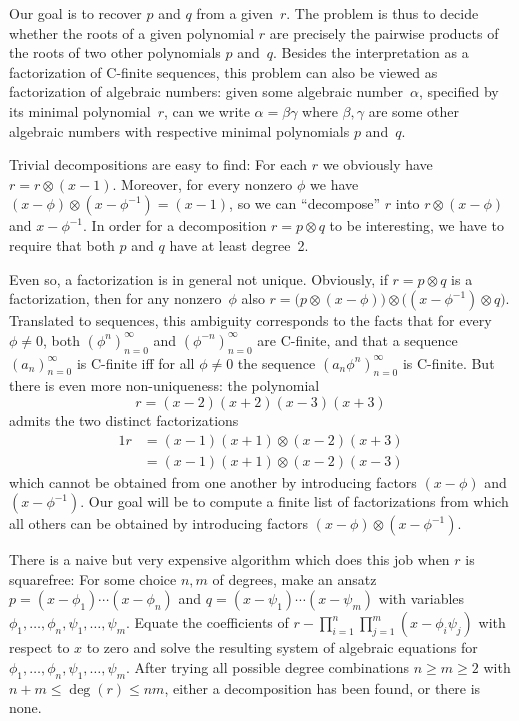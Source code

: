 \documentclass{sig-alternate}
\begin{document}
Our goal is to recover $p$ and $q$ from a given~$r$.
The problem is thus to decide whether the roots of a given polynomial $r$ are precisely
the pairwise products of the roots of two other polynomials $p$ and~$q$.
Besides the interpretation as a factorization of C-finite sequences, this problem can
also be viewed as factorization of algebraic numbers: given some algebraic number~$\alpha$,
specified by its minimal polynomial~$r$, can we write $\alpha=\beta\gamma$ where $\beta,\gamma$
are some other algebraic numbers with respective minimal polynomials $p$ and~$q$. 

Trivial decompositions are easy to find: For each $r$ we obviously have $r=r\otimes(x-1)$.
Moreover, for every nonzero $\phi$ we have $(x-\phi)\otimes(x-\phi^{-1})=(x-1)$, so we
can ``decompose'' $r$ into $r\otimes(x-\phi)$ and $x-\phi^{-1}$.
In order for a decomposition $r=p\otimes q$ to be interesting, we have to require that
both $p$ and $q$ have at least degree~2.

Even so, a factorization is in general not unique. Obviously, if $r=p\otimes q$ is a factorization,
then for any nonzero~$\phi$ also $r=\bigl(p\otimes(x-\phi)\bigr)\otimes\bigl((x-\phi^{-1})\otimes q\bigr)$.
Translated to sequences, this ambiguity corresponds to the facts that for every $\phi\neq0$, both
$(\phi^{n})_{n=0}^\infty$ and $(\phi^{-n})_{n=0}^\infty$ are C-finite, and that a sequence $(a_n)_{n=0}^\infty$ is C-finite
iff for all $\phi\neq0$ the sequence $(a_n\phi^n)_{n=0}^\infty$ is C-finite. 
But there is even more non-uniqueness: the polynomial
\[
  r=(x-2)(x+2)(x-3)(x+3)
\]
admits the two distinct factorizations
\begin{alignat*}1
  r&=(x-1)(x+1)\otimes(x-2)(x+3)\\
   &=(x-1)(x+1)\otimes(x-2)(x-3)
\end{alignat*}
which cannot be obtained from one another by introducing factors $(x-\phi)$ and
$(x-\phi^{-1})$. Our goal will be to compute a finite list of factorizations
from which all others can be obtained by introducing factors
$(x-\phi)\otimes(x-\phi^{-1})$.

There is a naive but very expensive algorithm which does this job when $r$ is
squarefree: For some choice $n,m$ of degrees, make an ansatz
$p=(x-\phi_1)\cdots(x-\phi_n)$ and $q=(x-\psi_1)\cdots(x-\psi_m)$ with variables
$\phi_1,\dots,\phi_n,\psi_1,\dots,\psi_m$.  Equate the coefficients of $r -
\prod_{i=1}^n\prod_{j=1}^m (x-\phi_i\psi_j)$ with respect to $x$ to zero and
solve the resulting system of algebraic equations for
$\phi_1,\dots,\phi_n,\psi_1,\dots,\psi_m$.  After trying all possible degree
combinations $n\geq m\geq2$ with $n+m\leq\deg(r)\leq nm$, either a decomposition
has been found, or there is none.
\end{document}
